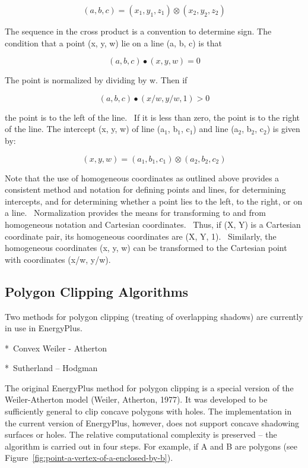 \begin{equation}
(a,b,c) = ({x_1},{y_1},{z_1}) \otimes ({x_2},{y_2},{z_2})
\end{equation}

The sequence in the cross product is a convention to determine sign. The condition that a point (x, y, w) lie on a line (a, b, c) is that

\begin{equation}
(a,b,c) \bullet (x,y,w) = 0
\end{equation}

The point is normalized by dividing by w. Then if

\begin{equation}
(a,b,c) \bullet (x/w,y/w,1) > 0
\end{equation}

the point is to the left of the line.~ If it is less than zero, the point is to the right of the line. The intercept (x, y, w) of line (a\(_{1}\), b\(_{1}\), c\(_{1}\)) and line (a\(_{2}\), b\(_{2}\), c\(_{2}\)) is given by:

\begin{equation}
(x,y,w) = ({a_1},{b_1},{c_1}) \otimes ({a_2},{b_2},{c_2})
\end{equation}

Note that the use of homogeneous coordinates as outlined above provides a consistent method and notation for defining points and lines, for determining intercepts, and for determining whether a point lies to the left, to the right, or on a line.~ Normalization provides the means for transforming to and from homogeneous notation and Cartesian coordinates.~ Thus, if (X, Y) is a Cartesian coordinate pair, its homogeneous coordinates are (X, Y, 1).~ Similarly, the homogeneous coordinates (x, y, w) can be transformed to the Cartesian point with coordinates (x/w, y/w).

\subsection{Polygon Clipping Algorithms}\label{polygon-clipping-algorithms}

Two methods for polygon clipping (treating of overlapping shadows) are currently in use in EnergyPlus.

*~Convex Weiler - Atherton

*~Sutherland -- Hodgman

The original EnergyPlus method for polygon clipping is a special version of the Weiler-Atherton model (Weiler, Atherton, 1977). It was developed to be sufficiently general to clip concave polygons with holes. The implementation in the current version of EnergyPlus, however, does not support concave shadowing surfaces or holes. The relative computational complexity is preserved -- the algorithm is carried out in four steps. For example, if A and B are polygons (see Figure~\ref{fig:point-a-vertex-of-a-enclosed-by-b}).

